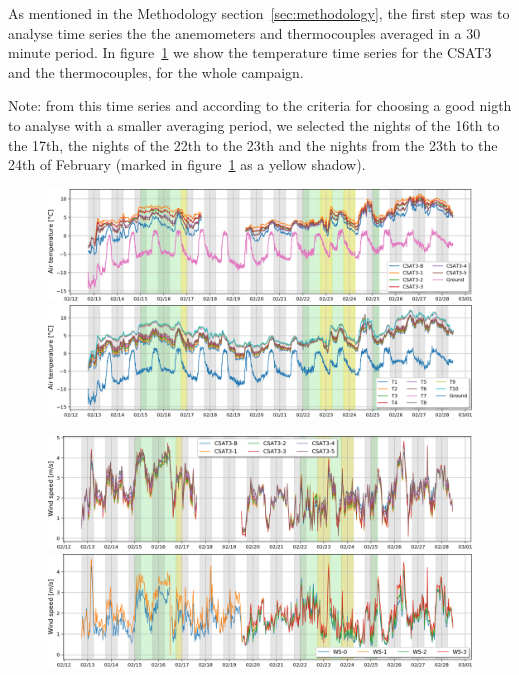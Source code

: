 As mentioned in the Methodology section~\ref{sec:methodology}, the first step was to analyse time series the the anemometers and thermocouples averaged in a 30 minute period. In figure~\ref{fig:temp_series} we show the temperature time series for the CSAT3 and the thermocouples, for the whole campaign.

Note: from this time series and according to the criteria for choosing a good nigth to analyse with a smaller averaging period, we selected the nights of the 16th to the 17th, the nights of the 22th to the 23th and the nights from the 23th to the 24th of February (marked in figure~\ref{fig:temp_series} as a yellow shadow). 

\begin{figure}
  \centering
  {
  \includegraphics[width=1\textwidth]{fig/chapter_4/T_series_csat.png}\\
   \includegraphics[width=1\textwidth]{fig/chapter_4/T_series_thermocouple.png}
   }
  \caption{}
  \label{fig:temp_series}
\end{figure}

\begin{figure}
  \centering
  {
  \includegraphics[width=1\textwidth]{fig/chapter_4/wind_speed_csat.png} \\
   \includegraphics[width=1\textwidth]{fig/chapter_4/wind_speed_ws.png}
   }
  \caption{}
  \label{fig:windspeed_series}
\end{figure}
